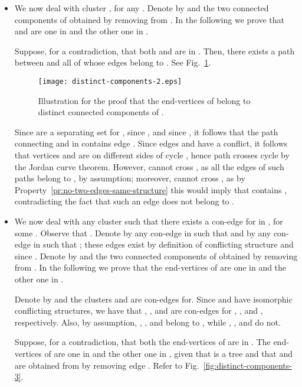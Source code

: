 \documentclass[letter,runningheads]{llncs}
\renewenvironment{proof}
{{\em Proof.\ }}{\hspace*{\fill}\par\vspace{2mm}}
\begin{document}
\begin{proof}
\begin{itemize}
\item We now deal with cluster , for any . Denote by  and  the two connected components of  obtained by removing  from . In the following we prove that  and  are one in  and the other one in .

Suppose, for a contradiction, that both  and  are in . Then, there exists a path  between  and  all of whose edges belong to . See Fig.~\ref{fig:distinct-components-2}.

\begin{figure}[tb]
\begin{center}
\mbox{\texttt{[image: distinct-components-2.eps]}}
\caption{Illustration for the proof that the end-vertices of  belong to distinct connected components of .}
\label{fig:distinct-components-2}
\end{center}
\end{figure}

Since  are a separating set for , since , and since , it follows that the path  connecting  and  in  contains edge . Since edges  and  have a conflict, it follows that vertices  and  are on different sides of cycle , hence path  crosses cycle  by the Jordan curve theorem. However,  cannot cross , as all the edges of such paths belong to , by assumption; moreover,  cannot cross , as by Property~\ref{pr:no-two-edges-same-structure} this would imply that  contains , contradicting the fact that such an edge does not belong to .



\item We now deal with any cluster  such that there exists a con-edge  for  in , for some . Observe that . Denote by  any con-edge in  such that  and by  any con-edge in  such that ; these edges exist by definition of conflicting structure and since . Denote by  and  the two connected components of  obtained by removing  from . In the following we prove that the end-vertices of  are one in  and the other one in .

    Denote by  and  the clusters  and  are con-edges for. Since  and  have isomorphic conflicting structures, we have that , , and  are con-edges for , , and , respectively. Also, by assumption, , , and  belong to , while , , and  do not.

    Suppose, for a contradiction, that both the end-vertices of  are in . The end-vertices of  are one in  and the other one in , given that  is a tree and that  and  are obtained from  by removing edge . Refer to Fig.~\ref{fig:distinct-components-3}.


\end{itemize}
\end{proof}
\end{document}
